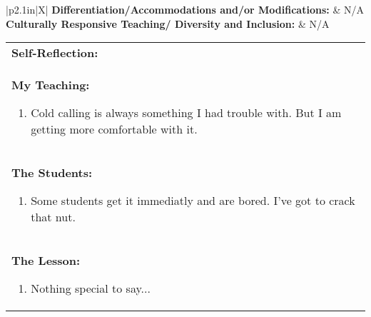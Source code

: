 \vskip 6pt

\begin{small}
\begin{tabularx}{\linewidth}{|p{2.1in}|X|}
  \hline
  \textbf{Differentiation/Accommodations and/or Modifications: } & N/A\\
  \hline
  \textbf{Culturally Responsive Teaching/ Diversity and Inclusion: } & N/A\\
  \hline
\end{tabularx}

\vskip 6pt

\begin{tabularx}{\linewidth}{|X|}
  \hline
  \textbf{Self-Reflection:} \\
  \textbf{My Teaching:} 
  \begin{enumerate}
  \item Cold calling is always something I had trouble with.  But I am getting more comfortable with it.
  \end{enumerate} \\
  
  \textbf{The Students:}
  \begin{enumerate}
  \item Some students get it immediatly and are bored.  I've got to crack that nut.
  \end{enumerate} \\
  
  \textbf{The Lesson:}
  \begin{enumerate}
  \item Nothing special to say...
  \end{enumerate} \\
  
  \hline
\end{tabularx}
\end{small}
